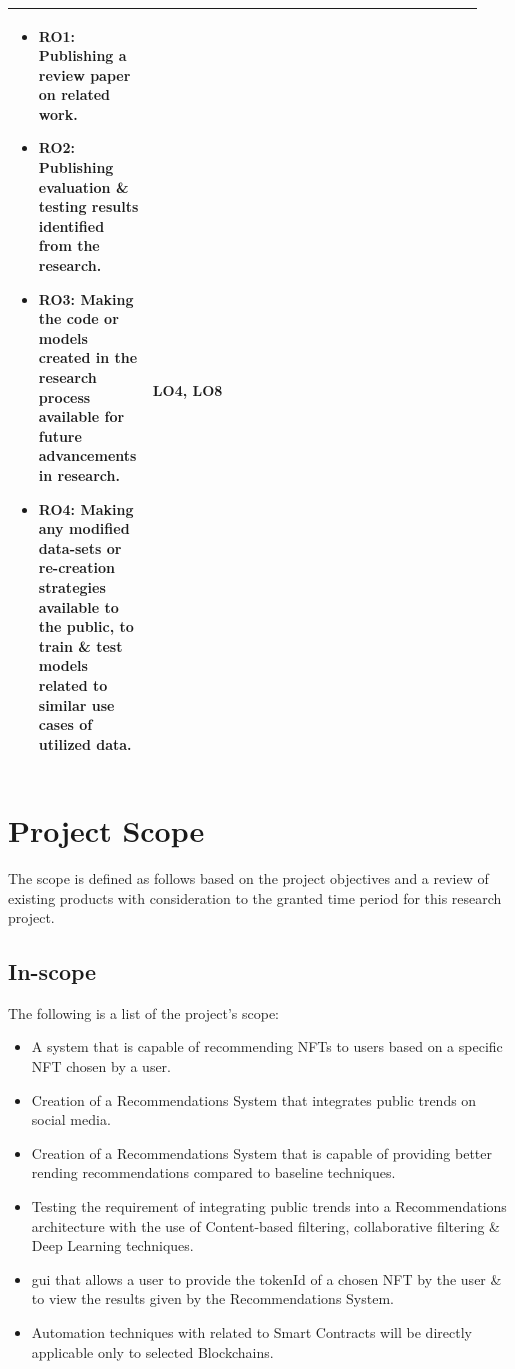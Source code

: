 \documentclass[a4paper, 12pt, oneside]{report}
\begin{document}
\begin{longtable}{| p{0.23\linewidth} | p{0.58\linewidth}| p{0.12\linewidth}|}
\begin{itemize}
\item \textbf{RO1:} Publishing a review paper on related work.
\item \textbf{RO2:} Publishing evaluation \& testing results identified from the research.
\item \textbf{RO3:} Making the code or models created in the research process available for future advancements in research.
\item \textbf{RO4:} Making any modified data-sets or re-creation strategies available to the public, to train \& test models related to similar use cases of utilized data.
\end{itemize}
& LO4, LO8 \\
\hline
\end{longtable}


\chapter{Project Scope}
The scope is defined as follows based on the project objectives and a review of existing products with consideration to the granted time period for this research project.

\section{In-scope}
The following is a list of the project's scope:
\begin{itemize}
\item A system that is capable of recommending NFTs to users based on a specific NFT chosen by a user.
\item Creation of a Recommendations System that integrates public trends on social media.
\item Creation of a Recommendations System that is capable of providing better rending recommendations compared to baseline techniques.
\item Testing the requirement of integrating public trends into a Recommendations architecture with the use of Content-based filtering, collaborative filtering \& Deep Learning techniques.
\item \Gls{gui} that allows a user to provide the tokenId of a chosen NFT by the user \& to view the results given by the Recommendations System.
\item Automation techniques with related to Smart Contracts will be directly applicable only to selected Blockchains.
\end{itemize}
\end{document}
